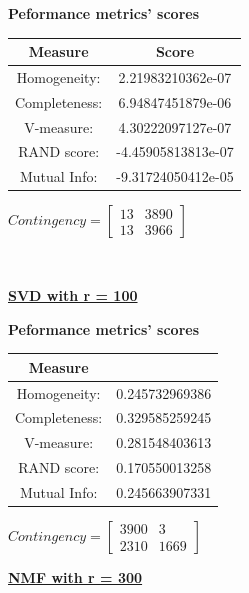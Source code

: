 \documentclass{article}
\begin{document}
\begin{center}
	\textbf{Peformance metrics' scores} \\ \vspace{10pt}	
	\begin{tabular}{*{2}{c}}
		\toprule
		\textbf{Measure} & \textbf{Score} \\
		\midrule
		Homogeneity: & 2.21983210362e-07 \\
		\midrule
		Completeness: & 6.94847451879e-06 \\
		\midrule
		V-measure: & 4.30222097127e-07 \\
		\midrule
		RAND score: & -4.45905813813e-07 \\
		\midrule
		Mutual Info: & -9.31724050412e-05  \\
		\bottomrule
	\end{tabular}
	\qquad	
	$Contingency = \left[\begin{array}{*{2}{c}}
		13 	& 3890 \\
		13 	& 3966 
			\end{array} \right]
		$
\end{center}
\\ \vspace{20pt}

\underline{\textbf{SVD with r = 100}} 

\begin{center}
	\textbf{Peformance metrics' scores} \\ \vspace{10pt}
	\begin{tabular}{*{2}{c}}
		\toprule
		\textbf{Measure} & \texbf{Score} \\
		\midrule 		
		Homogeneity: & 0.245732969386 \\
		\midrule
		Completeness: & 0.329585259245 \\
		\midrule
		V-measure: 	& 0.281548403613 \\
		\midrule
		RAND score: & 0.170550013258 \\
		\midrule
		Mutual Info: & 0.245663907331 \\
		\bottomrule
	\end{tabular}
	\qquad
	$Contingency = \left[\begin{array}{*{2}{c}}
		3900  & 3 \\
		2310  & 1669 
			\end{array} \right]
		$
\end{center}
\newpage

\underline{\textbf{NMF with r = 300}} 
\end{document}
